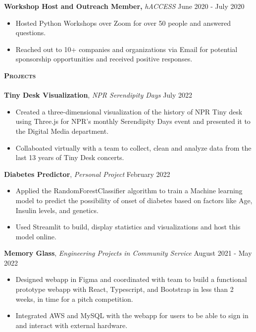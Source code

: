 \documentclass[10pt, a4paper]{article}
\newcommand{\lineunder} {
    \vspace*{-8pt} \\
    \hspace*{-18pt} \hrulefill \\
}
\newcommand{\header} [1] {
    {\hspace*{-15pt}\vspace*{3pt} \textsc{#1}}
    \vspace*{-6pt} \lineunder
}
\begin{document}
\textbf{Workshop Host and Outreach Member, }\textit{hACCESS}  \hfill June 2020 - July 2020\\
\vspace{-2mm}
\begin{itemize} \itemsep 1pt
    \itemsep-0.05em
	\item Hosted Python Workshops over Zoom for over 50 people and answered questions.
	\item Reached out to 10+ companies and organizations via Email for potential sponsorship opportunities and received positive responses.
\end{itemize}


\header{\textbf{Projects}}
\textbf{Tiny Desk Visualization}, \textit{NPR Serendipity Days}
\hfill July 2022\\
\vspace{-2mm}
\begin{itemize}
    \itemsep-0.05em
    \item Created a three-dimensional visualization of the history of NPR Tiny desk using Three.js for NPR's monthly Serendipity Days event and presented it to the Digital Media department. 
    \item Collaboated virtually with a team to collect, clean and analyze data from the last 13 years of Tiny Desk concerts. 
\end{itemize}
\textbf{Diabetes Predictor}, \textit{Personal Project}
\hfill February 2022\\
\vspace{-2mm}
\begin{itemize}
    \itemsep-0.05em
    \item Applied the RandomForestClassifier algorithm to train a Machine learning model to predict the possibility of onset of diabetes based on factors like Age, Insulin levels, and genetics.
    \item Used Streamlit to build, display statistics and visualizations and host this model online. 
\end{itemize}
\textbf{Memory Glass},  \textit{Engineering Projects in Community Service} 
\hfill August 2021 - May 2022\\
\vspace{-2mm}
\begin{itemize}
    \itemsep-0.05em
    \item Designed webapp in Figma and coordinated with team to build a functional prototype webapp with React, Typescript, and Bootstrap in less than 2 weeks, in time for a pitch competition. 
    \item Integrated AWS and MySQL with the webapp for users to be able to sign in and interact with external hardware.
    
\end{itemize}
\end{document}
